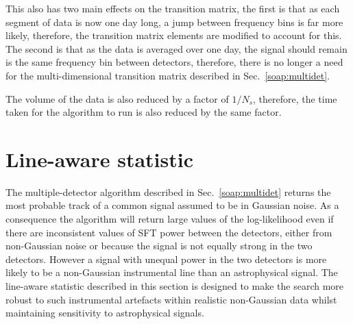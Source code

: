 This also has two main effects on the transition matrix, the first is that as each segment of data is now one day long, a jump between frequency bins is far more likely, therefore, the transition matrix elements are modified to account for this. The second is that as the data is averaged over one day, the signal should remain is the same frequency bin between detectors, therefore, there is no longer a need for the multi-dimensional transition matrix described in Sec.~\ref{soap:multidet}.

The volume of the data is also reduced by a factor of $1/N_s$, therefore, the time taken for the algorithm to run is also reduced by the same factor.

\section{\label{soap:las}Line-aware statistic}
%
%
The multiple-detector algorithm described in Sec.~\ref{soap:multidet} returns the most probable track of a common signal assumed to be in Gaussian noise. As a consequence the algorithm will return large values of the log-likelihood even if there are inconsistent values of \gls{SFT} power between the detectors, either from non-Gaussian noise or because the signal is not equally strong in the two detectors. However a signal with unequal power in the two detectors is more likely to be a non-Gaussian instrumental line than an astrophysical signal. The line-aware statistic described in this section is designed to make the search more robust to such instrumental artefacts within realistic non-Gaussian data whilst maintaining sensitivity to astrophysical signals.

